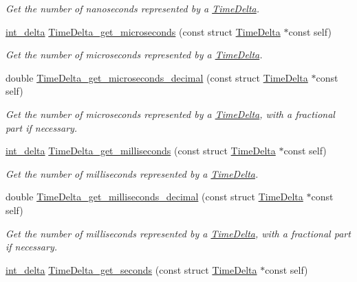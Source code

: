 \begin{DoxyCompactItemize}
\begin{DoxyCompactList}\small\item\em \-Get the number of nanoseconds represented by a \hyperlink{structTimeDelta}{\-Time\-Delta}. \end{DoxyCompactList}\item 
\hyperlink{types_8h_a10729255b1946fd4fb654b2fe814910b}{int\-\_\-delta} \hyperlink{time-delta_8h_abb6e5f84d388603a3435795055628238}{\-Time\-Delta\-\_\-get\-\_\-microseconds} (const struct \hyperlink{structTimeDelta}{\-Time\-Delta} $\ast$const self)
\begin{DoxyCompactList}\small\item\em \-Get the number of microseconds represented by a \hyperlink{structTimeDelta}{\-Time\-Delta}. \end{DoxyCompactList}\item 
double \hyperlink{time-delta_8h_a1a423d7912a4f1cafa24a51c6aa83529}{\-Time\-Delta\-\_\-get\-\_\-microseconds\-\_\-decimal} (const struct \hyperlink{structTimeDelta}{\-Time\-Delta} $\ast$const self)
\begin{DoxyCompactList}\small\item\em \-Get the number of microseconds represented by a \hyperlink{structTimeDelta}{\-Time\-Delta}, with a fractional part if necessary. \end{DoxyCompactList}\item 
\hyperlink{types_8h_a10729255b1946fd4fb654b2fe814910b}{int\-\_\-delta} \hyperlink{time-delta_8h_a975595bac014708aef45bf7f2b6c1eb6}{\-Time\-Delta\-\_\-get\-\_\-milliseconds} (const struct \hyperlink{structTimeDelta}{\-Time\-Delta} $\ast$const self)
\begin{DoxyCompactList}\small\item\em \-Get the number of milliseconds represented by a \hyperlink{structTimeDelta}{\-Time\-Delta}. \end{DoxyCompactList}\item 
double \hyperlink{time-delta_8h_a3f2a375289348737273a4c5054e8e290}{\-Time\-Delta\-\_\-get\-\_\-milliseconds\-\_\-decimal} (const struct \hyperlink{structTimeDelta}{\-Time\-Delta} $\ast$const self)
\begin{DoxyCompactList}\small\item\em \-Get the number of milliseconds represented by a \hyperlink{structTimeDelta}{\-Time\-Delta}, with a fractional part if necessary. \end{DoxyCompactList}\item 
\hyperlink{types_8h_a10729255b1946fd4fb654b2fe814910b}{int\-\_\-delta} \hyperlink{time-delta_8h_a828a74fdc1d24a5086d727b1522167d3}{\-Time\-Delta\-\_\-get\-\_\-seconds} (const struct \hyperlink{structTimeDelta}{\-Time\-Delta} $\ast$const self)

\end{DoxyCompactItemize}
